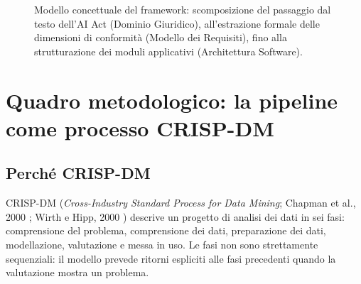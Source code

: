 \documentclass[12pt,a4paper,oneside]{report}
\begin{document}
\begin{figure}[htbp]
{
}
\caption[Modello concettuale del passaggio dal testo normativo all'architettura software]{Modello concettuale del framework: scomposizione del passaggio dal testo dell'AI Act (Dominio Giuridico), all'estrazione formale delle dimensioni di conformità (Modello dei Requisiti), fino alla strutturazione dei moduli applicativi (Architettura Software).}
\label{fig:modello_concettuale}
\end{figure}
 

\section{Quadro metodologico: la pipeline come processo CRISP-DM}
\subsection{Perché CRISP-DM}
CRISP-DM (\textit{Cross-Industry Standard Process for Data Mining}; Chapman et al., 2000 \cite{chapman2000crispdm}; Wirth e Hipp, 2000 \cite{wirth2000crispdm}) descrive un progetto di analisi dei dati in sei fasi: comprensione del problema, comprensione dei dati, preparazione dei dati, modellazione, valutazione e messa in uso. Le fasi non sono strettamente sequenziali: il modello prevede ritorni espliciti alle fasi precedenti quando la valutazione mostra un problema.
\end{document}
